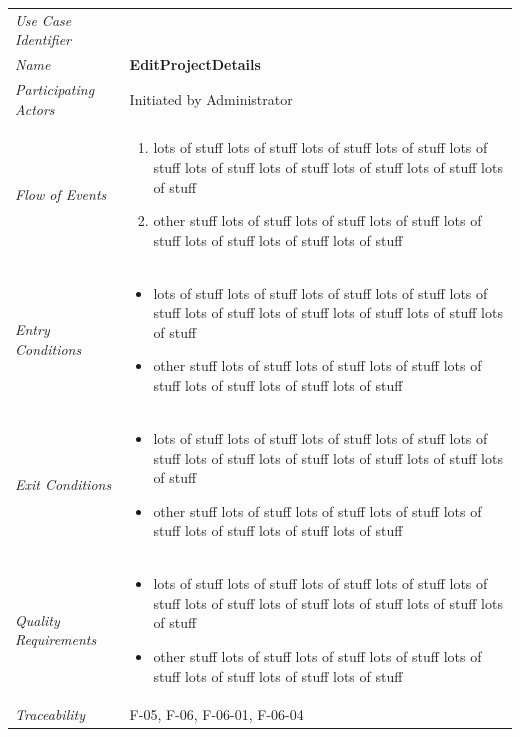 \documentclass[12pt,letterpaper]{article}
\begin{document}
\begin{center}
	\begin{tabu} to 
		\toprule
		Use Case Identifier & \editprojectdetails{} \\
		Name & {\bf EditProjectDetails} \\
		Participating Actors & Initiated by Administrator \\
		Flow of Events & 
	    \begin{enumerate}[topsep=-1em]
		    \item lots of stuff lots of stuff lots of stuff lots of stuff lots of stuff lots of stuff lots of stuff lots of stuff lots of stuff lots of stuff
		    \item other stuff lots of stuff lots of stuff lots of stuff lots of stuff lots of stuff lots of stuff lots of stuff
		\end{enumerate} \\

		Entry Conditions &
		\begin{itemize}[topsep=-1em]
		    \item lots of stuff lots of stuff lots of stuff lots of stuff lots of stuff lots of stuff lots of stuff lots of stuff lots of stuff lots of stuff
		    \item other stuff lots of stuff lots of stuff lots of stuff lots of stuff lots of stuff lots of stuff lots of stuff
        \end{itemize} \\

		Exit Conditions &
		\begin{itemize}[topsep=-1em]
		    \item lots of stuff lots of stuff lots of stuff lots of stuff lots of stuff lots of stuff lots of stuff lots of stuff lots of stuff lots of stuff
		    \item other stuff lots of stuff lots of stuff lots of stuff lots of stuff lots of stuff lots of stuff lots of stuff
        \end{itemize} \\

		Quality Requirements &
		\begin{itemize}[topsep=-1em]
		    \item lots of stuff lots of stuff lots of stuff lots of stuff lots of stuff lots of stuff lots of stuff lots of stuff lots of stuff lots of stuff
		    \item other stuff lots of stuff lots of stuff lots of stuff lots of stuff lots of stuff lots of stuff lots of stuff
        \end{itemize} \\

		Traceability & F-05, F-06, F-06-01, F-06-04 \\
		\toprule
	\end{tabu}
\end{center}
\end{document}
